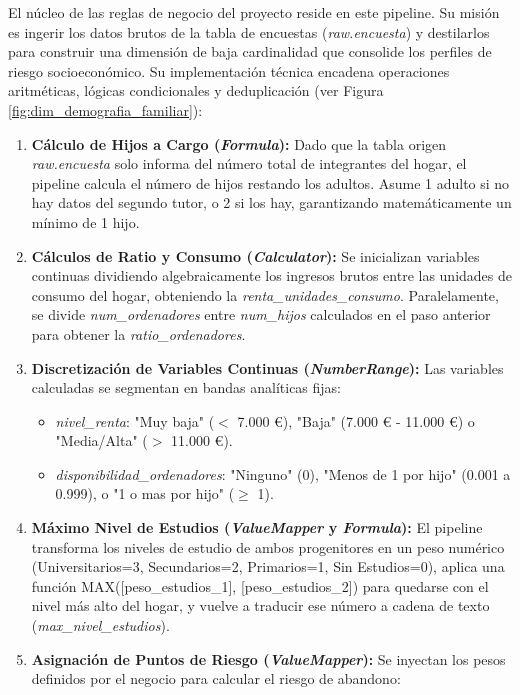 El núcleo de las reglas de negocio del proyecto reside en este pipeline. Su misión es ingerir los datos brutos de la tabla de encuestas (\textit{raw.encuesta}) y destilarlos para construir una dimensión de baja cardinalidad que consolide los perfiles de riesgo socioeconómico. Su implementación técnica encadena operaciones aritméticas, lógicas condicionales y deduplicación (ver Figura \ref{fig:dim_demografia_familiar}):

\begin{enumerate}
    \item \textbf{Cálculo de Hijos a Cargo (\textit{Formula}):} Dado que la tabla origen \textit{raw.encuesta} solo informa del número total de integrantes del hogar, el pipeline calcula el número de hijos restando los adultos. Asume 1 adulto si no hay datos del segundo tutor, o 2 si los hay, garantizando matemáticamente un mínimo de 1 hijo.
    \item \textbf{Cálculos de Ratio y Consumo (\textit{Calculator}):} Se inicializan variables continuas dividiendo algebraicamente los ingresos brutos entre las unidades de consumo del hogar, obteniendo la \textit{renta\_unidades\_consumo}. Paralelamente, se divide \textit{num\_ordenadores} entre \textit{num\_hijos} calculados en el paso anterior para obtener la \textit{ratio\_ordenadores}.
    \item \textbf{Discretización de Variables Continuas (\textit{NumberRange}):} Las variables calculadas se segmentan en bandas analíticas fijas:
    \begin{itemize}
        \item \textit{nivel\_renta}: "Muy baja" ($<$ 7.000 €), "Baja" (7.000 € - 11.000 €) o "Media/Alta" ($>$ 11.000 €).
        \item \textit{disponibilidad\_ordenadores}: "Ninguno" (0), "Menos de 1 por hijo" (0.001 a 0.999), o "1 o mas por hijo" ($\ge$ 1).
    \end{itemize}
    \item \textbf{Máximo Nivel de Estudios (\textit{ValueMapper} y \textit{Formula}):} El pipeline transforma los niveles de estudio de ambos progenitores en un peso numérico (Universitarios=3, Secundarios=2, Primarios=1, Sin Estudios=0), aplica una función MAX([peso\_estudios\_1], [peso\_estudios\_2]) para quedarse con el nivel más alto del hogar, y vuelve a traducir ese número a cadena de texto (\textit{max\_nivel\_estudios}).
    \item \textbf{Asignación de Puntos de Riesgo (\textit{ValueMapper}):} Se inyectan los pesos definidos por el negocio para calcular el riesgo de abandono:

\end{enumerate}
